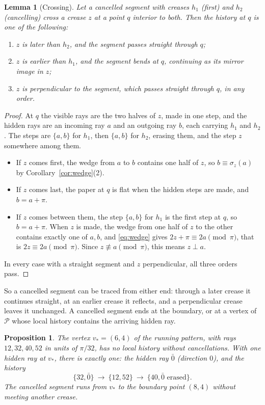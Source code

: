 \documentclass[11pt]{article}
\newtheorem{proposition}[theorem]{Proposition}
\newtheorem{lemma}[theorem]{Lemma}
\theoremstyle{definition}
\theoremstyle{remark}
\newcommand{\vstar}{v_\ast}
\newcommand{\hid}[1]{\bar{#1}}
\begin{document}
\begin{lemma}[Crossing]\label{lem:crossing}
Let a cancelled segment with creases $h_1$ (first) and $h_2$ (cancelling) cross a crease $z$ at a point $q$ interior to both. Then the history at $q$ is one of the following:
\begin{enumerate}
\item $z$ is later than $h_2$, and the segment passes straight through $q$;
\item $z$ is earlier than $h_1$, and the segment bends at $q$, continuing as its mirror image in $z$;
\item $z$ is perpendicular to the segment, which passes straight through $q$, in any order.
\end{enumerate}
\end{lemma}

\begin{proof}
At $q$ the visible rays are the two halves of $z$, made in one step, and the hidden rays are an incoming ray $a$ and an outgoing ray $b$, each carrying $h_1$ and $h_2$. The steps are $\{a,b\}$ for $h_1$, then $\{a,b\}$ for $h_2$, erasing them, and the step $z$ somewhere among them.
\begin{itemize}
\item If $z$ comes first, the wedge from $a$ to $b$ contains one half of $z$, so $b\equiv\sigma_z(a)$ by Corollary~\ref{cor:wedge}(2).
\item If $z$ comes last, the paper at $q$ is flat when the hidden steps are made, and $b=a+\pi$.
\item If $z$ comes between them, the step $\{a,b\}$ for $h_1$ is the first step at $q$, so $b=a+\pi$. When $z$ is made, the wedge from one half of $z$ to the other contains exactly one of $a,b$, and \eqref{eq:wedge} gives $2z+\pi\equiv2a\pmod\pi$, that is $2z\equiv 2a\pmod\pi$. Since $z\not\equiv a\pmod\pi$, this means $z\perp a$.
\end{itemize}
In every case with a straight segment and $z$ perpendicular, all three orders pass.
\end{proof}

So a cancelled segment can be traced from either end: through a later crease it continues straight, at an earlier crease it reflects, and a perpendicular crease leaves it unchanged. A cancelled segment ends at the boundary, or at a vertex of $\mathcal P$ whose local history contains the arriving hidden ray.

\begin{proposition}\label{prop:vstar}
The vertex $\vstar=(6,4)$ of the running pattern, with rays $12,32,40,52$ in units of $\pi/32$, has no local history without cancellations. With one hidden ray at $\vstar$, there is exactly one: the hidden ray $\hid0$ (direction $0$), and the history
\[
\{32,\hid0\}\ \to\ \{12,52\}\ \to\ \{40,\hid0\text{ erased}\}.
\]
The cancelled segment runs from $\vstar$ to the boundary point $(8,4)$ without meeting another crease.
\end{proposition}
\end{document}
